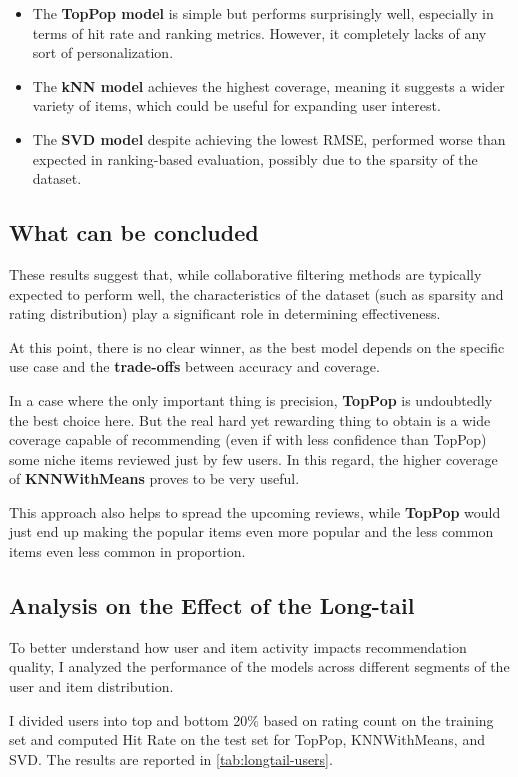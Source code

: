 \documentclass[11pt,a4paper]{article}
\begin{document}
\begin{itemize}
    \item The \textbf{TopPop model} is simple but performs surprisingly well, especially in terms of hit rate and ranking metrics. However, it completely lacks of any sort of personalization.
    \item The \textbf{kNN model} achieves the highest coverage, meaning it suggests a wider variety of items, which could be useful for expanding user interest.
    \item The \textbf{SVD model} despite achieving the lowest RMSE, performed worse than expected in ranking-based evaluation, possibly due to the sparsity of the dataset.
\end{itemize}

\subsection{What can be concluded}

These results suggest that, while collaborative filtering methods are typically expected to perform well, the characteristics of the dataset (such as sparsity and rating distribution) play a significant role in determining effectiveness.

At this point, there is no clear winner, as the best model depends on the specific use case and the \textbf{trade-offs} between accuracy and coverage.

In a case where the only important thing is precision, \textbf{TopPop} is undoubtedly the best choice here. But the real hard yet rewarding thing to obtain is a wide coverage capable of recommending (even if with less confidence than TopPop) some niche items reviewed just by few users. In this regard, the higher coverage of \textbf{KNNWithMeans} proves to be very useful.

This approach also helps to spread the upcoming reviews, while \textbf{TopPop} would just end up making the popular items even more popular and the less common items even less common in proportion.

\subsection{Analysis on the Effect of the Long-tail}
To better understand how user and item activity impacts recommendation quality, I analyzed the performance of the models across different segments of the user and item distribution.

I divided users into top and bottom 20\% based on rating count on the training set and computed Hit Rate on the test set for TopPop, KNNWithMeans, and SVD. The results are reported in \autoref{tab:longtail-users}.
\end{document}
